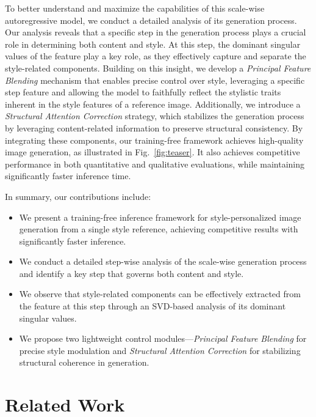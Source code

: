 \documentclass[10pt,twocolumn,letterpaper]{article}
\newcommand{\figref}[1]{Fig.~\ref{#1}}
\begin{document}
To better understand and maximize the capabilities of this scale-wise autoregressive model, we conduct a detailed analysis of its generation process.
Our analysis reveals that a specific step in the generation process plays a crucial role in determining both content and style. 
At this step, the dominant singular values of the feature play a key role, as they effectively capture and separate the style-related components.
Building on this insight, we develop a \textit{Principal Feature Blending} mechanism that enables precise control over style, leveraging a specific step feature and allowing the model to faithfully reflect the stylistic traits inherent in the style features of a reference image.
Additionally, we introduce a \textit{Structural Attention Correction} strategy, which stabilizes the generation process by leveraging content-related information to preserve structural consistency.
By integrating these components, our training-free framework achieves high-quality image generation, as illustrated in \figref{fig:teaser}. 
It also achieves competitive performance in both quantitative and qualitative evaluations, while maintaining significantly faster inference time.

In summary, our contributions include:
\begin{itemize}
	\item We present a training-free inference framework for style-personalized image generation from a single style reference, achieving competitive results with significantly faster inference.
	\item We conduct a detailed step-wise analysis of the scale-wise generation process and identify a key step that governs both content and style.
	\item We observe that style-related components can be effectively extracted from the feature at this step through an SVD-based analysis of its dominant singular values.
	\item We propose two lightweight control modules—\textit{Principal Feature Blending} for precise style modulation and \textit{Structural Attention Correction} for stabilizing structural coherence in generation.
\end{itemize}
\section{Related Work}
\end{document}
